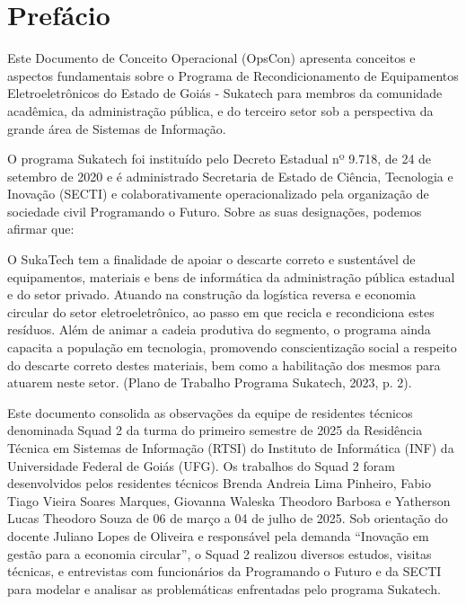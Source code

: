 \documentclass[
	12pt,				%
	openright,			%
	twoside,			%
	a4paper,			%
	english,			%
	french,				%
	spanish,			%
	brazil,				%
	]{abntex2}
\begin{document}
\textual

\chapter*[Prefácio]{Prefácio}

Este Documento de Conceito Operacional (OpsCon) apresenta conceitos e aspectos fundamentais sobre o Programa de Recondicionamento de Equipamentos Eletroeletrônicos do Estado de Goiás - Sukatech para membros da comunidade acadêmica, da administração pública, e do terceiro setor sob a perspectiva da grande área de Sistemas de Informação.

O programa Sukatech foi instituído pelo Decreto Estadual nº 9.718, de 24 de setembro de 2020 e é administrado Secretaria de Estado de Ciência, Tecnologia e Inovação (SECTI) e colaborativamente operacionalizado pela organização de sociedade civil Programando o Futuro. Sobre as suas designações, podemos afirmar que:

\begin{citacao}
O SukaTech tem a finalidade de apoiar o descarte correto e sustentável de equipamentos, materiais e bens de informática da administração pública estadual e do setor privado. Atuando na construção da logística reversa e economia circular do setor eletroeletrônico, ao passo em que recicla e recondiciona estes resíduos. Além de animar a cadeia produtiva do segmento, o programa ainda capacita a população em tecnologia, promovendo conscientização social a respeito do descarte correto destes materiais, bem como a habilitação dos mesmos para atuarem neste setor. (Plano de Trabalho Programa Sukatech, 2023, p. 2).
\end{citacao}

Este documento consolida as observações da equipe de residentes técnicos denominada Squad 2 da turma do primeiro semestre de 2025 da Residência Técnica em Sistemas de Informação (RTSI) do Instituto de Informática (INF) da Universidade Federal de Goiás (UFG). Os trabalhos do Squad 2 foram desenvolvidos pelos residentes técnicos Brenda Andreia Lima Pinheiro, Fabio Tiago Vieira Soares Marques, Giovanna Waleska Theodoro Barbosa e Yatherson Lucas Theodoro Souza de 06 de março a 04 de julho de 2025. Sob orientação do docente Juliano Lopes de Oliveira e responsável pela demanda ``Inovação em gestão para a economia circular'', o Squad 2 realizou diversos estudos, visitas técnicas, e entrevistas com funcionários da Programando o Futuro e da SECTI para modelar e analisar as problemáticas enfrentadas pelo programa Sukatech.
\end{document}
